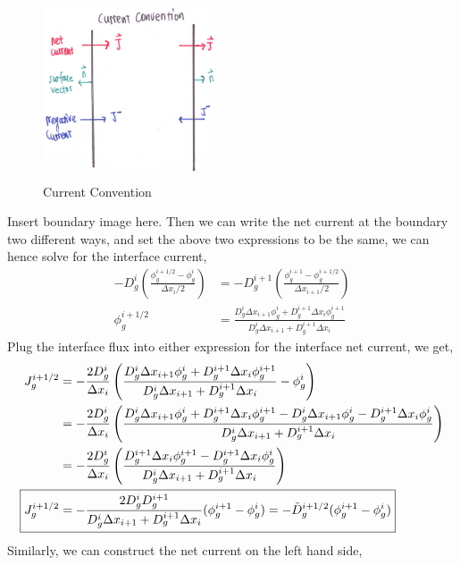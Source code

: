 \documentclass{school-22.211-notes}
\begin{document}
\clearpage
{}
\begin{figure}[ht]
  \centering
  \includegraphics[height=2in]{images/dfs/current-sign.png}
  \caption{Current Convention}
\end{figure}
Insert boundary image here. Then we can write the net current at the boundary two different ways, 
and set the above two expressions to be the same, we can hence solve for the interface current, 
\begin{align}
 -D_g^i \left( \frac{\phi_g^{i+1/2} - \phi_g^i}{\Delta x_i /2} \right) & =  -D_g^{i+1} \left( \frac{\phi_g^{i+1} - \phi_g^{i+1/2}}{\Delta x_{i+1} /2} \right) \\
\phi_g^{i+1/2} &= \frac{D_g^i \Delta x_{i+1} \phi_g^i + D_g^{i+1} \Delta x_i \phi_g^{i+1}}{D_g^i \Delta x_{i+1} + D_g^{i+1} \Delta x_i} 
\end{align}
Plug the interface flux into either expression for the interface net current, we get, 
\begin{align}
 J_g^{i+1/2} &= - \frac{2D_g^i}{\Delta x_i} \left( \frac{D_g^i \Delta x_{i+1} \phi_g^i + D_g^{i+1} \Delta x_i \phi_g^{i+1}}{D_g^i \Delta x_{i+1} + D_g^{i+1} \Delta x_i}  - \phi_g^i \right) \\
&= - \frac{2D_g^i}{\Delta x_i} \left( \frac{D_g^i \Delta x_{i+1} \phi_g^i + D_g^{i+1} \Delta x_i \phi_g^{i+1} - D_g^i \Delta x_{i+1} \phi_g^i - D_g^{i+1} \Delta x_i \phi_g^i }{D_g^i \Delta x_{i+1} + D_g^{i+1} \Delta x_i} \right) \\
&= - \frac{2D_g^i}{\Delta x_i} \left( \frac{D_g^{i+1} \Delta x_i \phi_g^{i+1} - D_g^{i+1} \Delta x_i \phi_g^i }{D_g^i \Delta x_{i+1} + D_g^{i+1} \Delta x_i} \right) \\
\Aboxed{ J_g^{i+1/2} &= - \frac{2D_g^i D_g^{i+1}}{D_g^i \Delta x_{i+1} + D_g^{i+1} \Delta x_i} (\phi_g^{i+1} - \phi_g^i) = - \tilde{D}_g^{i+1/2} (\phi_g^{i+1} - \phi_g^i) }
\end{align}
Similarly, we can construct the net current on the left hand side, 
\end{document}
